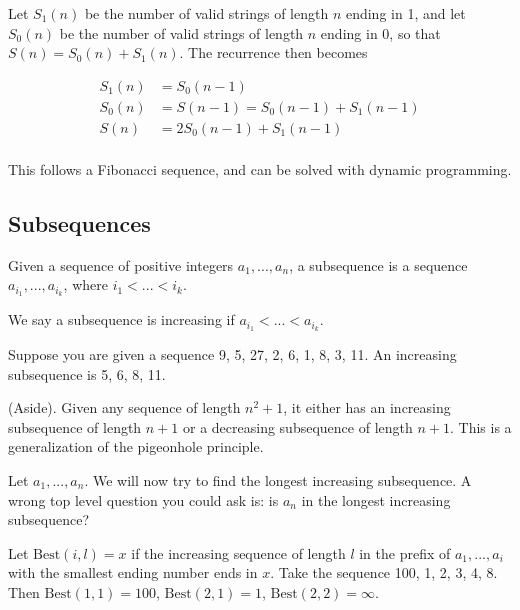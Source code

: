 Let $S_1(n)$ be the number of valid strings of length $n$ ending in 1,
and let $S_0(n)$ be the number of valid strings of length $n$ ending
in 0, so that $S(n) = S_0(n) + S_1(n)$. The recurrence then becomes


\begin{align*}
    S_1(n) &= S_0(n - 1) \\
    S_0(n) &= S(n - 1) = S_0(n- 1) + S_1(n - 1) \\
    S(n) &= 2S_0(n - 1) + S_1(n - 1) \\
\end{align*}

This follows a Fibonacci sequence, and can be solved with dynamic
programming.

\subsection{Subsequences}

\begin{definition}
    Given a sequence of positive integers $a_1, ..., a_n$, a subsequence
is a sequence $a_{i_1}, ..., a_{i_k}$, where $i_1 < ... < i_k$.     
\end{definition}

\begin{definition}
    We say a subsequence is increasing if $a_{i_1} < ... < a_{i_k}$.
\end{definition}

Suppose you are given a sequence 9, 5, 27, 2, 6, 1, 8, 3, 11.
An increasing subsequence is 5, 6, 8, 11.

\begin{remark}
    (Aside). Given any sequence of length $n^2 + 1$, it either has
    an increasing subsequence of length $n + 1$ or a decreasing
    subsequence of length $n + 1$. This is a generalization of the
    pigeonhole principle.
\end{remark}

Let $a_1, ..., a_n$.
We will now try to find the longest increasing
subsequence. A wrong top level question you could ask is: is $a_n$ in
the longest increasing subsequence? 

Let $\text{Best}(i, l) = x$ if the increasing sequence of length $l$
in the prefix of $a_1, ..., a_i$ with the smallest ending number
ends in $x$. Take the sequence 100, 1, 2, 3, 4, 8.
Then $\text{Best}(1, 1) = 100$, $\text{Best}(2, 1) = 1$,
$\text{Best}(2, 2) = \infty$. 















